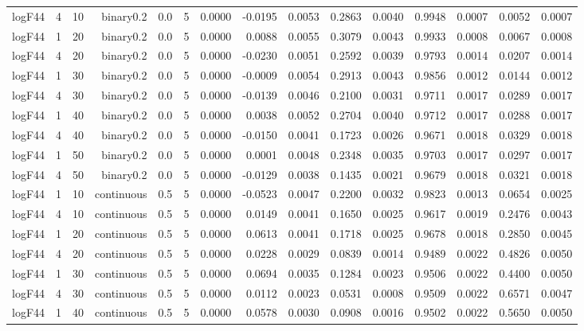 \begin{longtable}{rrrrrrrrrrrrrrr}
  logF44 & 4 & 10 & binary0.2 & 0.0 & 5 & 0.0000 & -0.0195 & 0.0053 & 0.2863 & 0.0040 & 0.9948 & 0.0007 & 0.0052 & 0.0007 \\ 
  logF44 & 1 & 20 & binary0.2 & 0.0 & 5 & 0.0000 & 0.0088 & 0.0055 & 0.3079 & 0.0043 & 0.9933 & 0.0008 & 0.0067 & 0.0008 \\ 
  logF44 & 4 & 20 & binary0.2 & 0.0 & 5 & 0.0000 & -0.0230 & 0.0051 & 0.2592 & 0.0039 & 0.9793 & 0.0014 & 0.0207 & 0.0014 \\ 
  logF44 & 1 & 30 & binary0.2 & 0.0 & 5 & 0.0000 & -0.0009 & 0.0054 & 0.2913 & 0.0043 & 0.9856 & 0.0012 & 0.0144 & 0.0012 \\ 
  logF44 & 4 & 30 & binary0.2 & 0.0 & 5 & 0.0000 & -0.0139 & 0.0046 & 0.2100 & 0.0031 & 0.9711 & 0.0017 & 0.0289 & 0.0017 \\ 
  logF44 & 1 & 40 & binary0.2 & 0.0 & 5 & 0.0000 & 0.0038 & 0.0052 & 0.2704 & 0.0040 & 0.9712 & 0.0017 & 0.0288 & 0.0017 \\ 
  logF44 & 4 & 40 & binary0.2 & 0.0 & 5 & 0.0000 & -0.0150 & 0.0041 & 0.1723 & 0.0026 & 0.9671 & 0.0018 & 0.0329 & 0.0018 \\ 
  logF44 & 1 & 50 & binary0.2 & 0.0 & 5 & 0.0000 & 0.0001 & 0.0048 & 0.2348 & 0.0035 & 0.9703 & 0.0017 & 0.0297 & 0.0017 \\ 
  logF44 & 4 & 50 & binary0.2 & 0.0 & 5 & 0.0000 & -0.0129 & 0.0038 & 0.1435 & 0.0021 & 0.9679 & 0.0018 & 0.0321 & 0.0018 \\ 
  logF44 & 1 & 10 & continuous & 0.5 & 5 & 0.0000 & -0.0523 & 0.0047 & 0.2200 & 0.0032 & 0.9823 & 0.0013 & 0.0654 & 0.0025 \\ 
  logF44 & 4 & 10 & continuous & 0.5 & 5 & 0.0000 & 0.0149 & 0.0041 & 0.1650 & 0.0025 & 0.9617 & 0.0019 & 0.2476 & 0.0043 \\ 
  logF44 & 1 & 20 & continuous & 0.5 & 5 & 0.0000 & 0.0613 & 0.0041 & 0.1718 & 0.0025 & 0.9678 & 0.0018 & 0.2850 & 0.0045 \\ 
  logF44 & 4 & 20 & continuous & 0.5 & 5 & 0.0000 & 0.0228 & 0.0029 & 0.0839 & 0.0014 & 0.9489 & 0.0022 & 0.4826 & 0.0050 \\ 
  logF44 & 1 & 30 & continuous & 0.5 & 5 & 0.0000 & 0.0694 & 0.0035 & 0.1284 & 0.0023 & 0.9506 & 0.0022 & 0.4400 & 0.0050 \\ 
  logF44 & 4 & 30 & continuous & 0.5 & 5 & 0.0000 & 0.0112 & 0.0023 & 0.0531 & 0.0008 & 0.9509 & 0.0022 & 0.6571 & 0.0047 \\ 
  logF44 & 1 & 40 & continuous & 0.5 & 5 & 0.0000 & 0.0578 & 0.0030 & 0.0908 & 0.0016 & 0.9502 & 0.0022 & 0.5650 & 0.0050 \\ 

\end{longtable}
